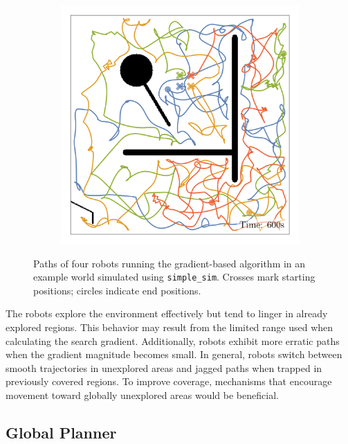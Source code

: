 \begin{figure}[H]
\begin{subfigure}[b]{\w}
    \end{subfigure}
    \begin{subfigure}[b]{\w}
        \centering
        \includegraphics[width=\textwidth]{./figures/plots/paths/search:gradient-paths-(after-600s).png}
    \end{subfigure}
    \caption{Paths of four robots running the gradient-based algorithm in an example world simulated using \texttt{simple\_sim}. Crosses mark starting positions; circles indicate end positions.}
    \label{fig:gradient-paths}
\end{figure}

The robots explore the environment effectively but tend to linger in already explored regions. This behavior may result from the limited range used when calculating the search gradient. Additionally, robots exhibit more erratic paths when the gradient magnitude becomes small. In general, robots switch between smooth trajectories in unexplored areas and jagged paths when trapped in previously covered regions. To improve coverage, mechanisms that encourage movement toward globally unexplored areas would be beneficial.

\subsection{Global Planner}

